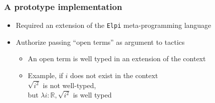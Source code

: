 \documentclass[compress]{beamer}
\begin{document}
\begin{frame}
\frametitle{A prototype implementation}
\begin{itemize}
\item Required an extension of the {\tt Elpi} meta-programming language
\item Authorize passing ``open terms'' as argument to tactics
\begin{itemize}
\item An open term is well typed in an extension of the context
\item Example, if \(i\) does not exist in the context\\
 \(\sqrt{i^2}\) is not well-typed,\\
 but \(\lambda i : {\mathbb R}, \sqrt{i^2}\) is well typed
\end{itemize}
\end{itemize}

\end{frame}
\end{document}
